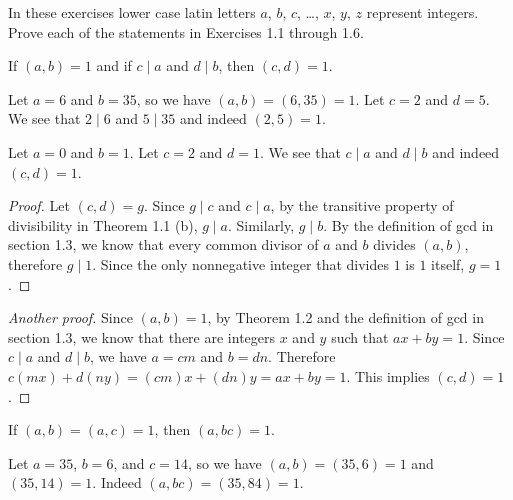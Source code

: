 

In these exercises lower case latin letters \( a \), \( b \), \( c \),
\dots, \( x \), \( y \), \( z \) represent integers. Prove each of the
statements in Exercises 1.1 through 1.6.


\begin{exercise}{1}{}
  If \( (a, b) = 1 \) and if \( c \mid a \) and \( d \mid b \), then
  \( (c, d) = 1 \).
\end{exercise}

\begin{example}
  Let \( a = 6 \) and \( b = 35 \), so we have \( (a, b) = (6, 35) = 1
  \). Let \( c = 2 \) and \( d = 5 \). We see that \( 2 \mid 6 \) and
  \( 5 \mid 35 \) and indeed \( (2, 5) = 1 \).
\end{example}

\begin{example}
  Let \( a = 0 \) and \( b = 1 \). Let \( c = 2 \) and \( d = 1 \). We
  see that \( c \mid a \) and \( d \mid b \) and indeed \( (c, d) = 1
  \).
\end{example}

\begin{proof}
  Let \( (c, d) = g \). Since \( g \mid c \) and \( c \mid a \), by
  the transitive property of divisibility in Theorem 1.1 (b), \( g
  \mid a \). Similarly, \( g \mid b \). By the definition of gcd in
  section 1.3, we know that every common divisor of \( a \) and \( b
  \) divides \( (a, b) \), therefore \( g \mid 1 \). Since the only
  nonnegative integer that divides \( 1 \) is \( 1 \) itself, \( g = 1
  \).
\end{proof}

\begin{proof}[Another proof]
  Since \( (a, b) = 1 \), by Theorem 1.2 and the definition of gcd in
  section 1.3, we know that there are integers \( x \) and \( y \)
  such that \( ax + by = 1 \). Since \( c \mid a \) and \( d \mid b
  \), we have \( a = cm \) and \( b = dn \). Therefore \( c(mx) +
  d(ny) = (cm)x + (dn)y = ax + by = 1 \). This implies \( (c, d) = 1
  \).
\end{proof}


\begin{exercise}{2}{}
  If \( (a, b) = (a, c) = 1 \), then \( (a, bc) = 1 \).
\end{exercise}

\begin{example}
  Let \( a = 35 \), \( b = 6 \), and \( c = 14 \), so we have \( (a,
  b) = (35, 6) = 1 \) and \( (35, 14) = 1 \). Indeed \( (a, bc) = (35,
  84) = 1 \).
\end{example}

